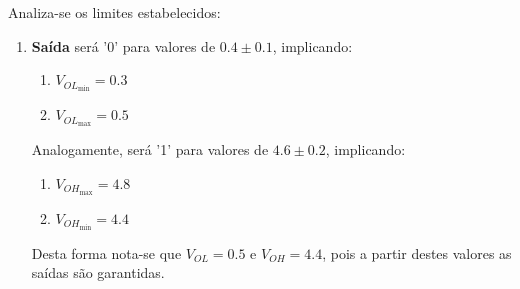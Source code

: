 \documentclass{article}
\begin{document}
            \begin{resolution}
                Analiza-se os limites estabelecidos:
                    \begin{enumerate}[rightmargin = \leftmargin]
                        \item \textbf{Saída} será '0' para valores de $0.4 \pm 0.1$, implicando:
                            \begin{enumerate}[noitemsep, rightmargin = \leftmargin]
                                \item $V_{OL_{\text{min}}} = 0.3$
                                \item $V_{OL_{\text{max}}} = 0.5$
                            \end{enumerate}
                        Analogamente, será '1' para valores de $4.6 \pm 0.2$, implicando:
                            \begin{enumerate}[noitemsep, rightmargin = \leftmargin]
                                \item $V_{OH_{\text{max}}} = 4.8$
                                \item $V_{OH_{\text{min}}} = 4.4$
                            \end{enumerate}
                        Desta forma nota-se que $V_{OL} = 0.5$ e $V_{OH} = 4.4$, pois a partir destes valores as saídas são garantidas.
                        

\end{enumerate}
\end{resolution}
\end{document}
